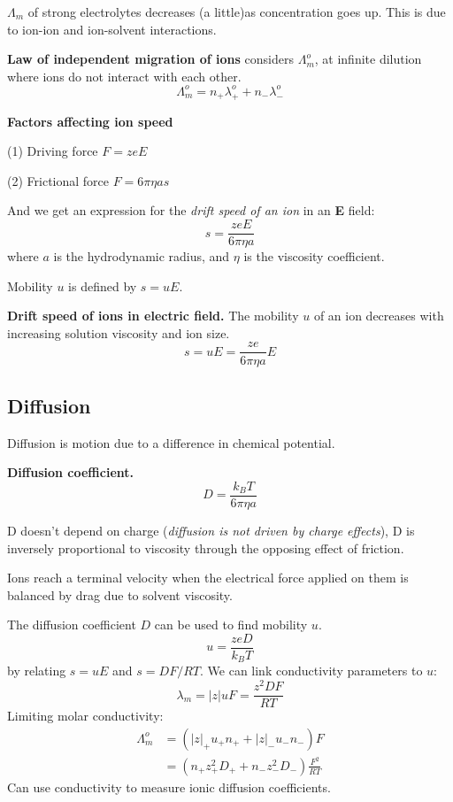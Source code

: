 $\Lambda_m$ of strong electrolytes decreases (a little)as concentration goes up. This is due to ion-ion and ion-solvent interactions.

\textbf{Law of independent migration of ions} considers $\Lambda_m^o$, at infinite dilution where ions do not interact with each other.
\begin{equation*}
    \Lambda_m^o = n_{+} \lambda_{+}^o + n_{-} \lambda_{-}^o
\end{equation*}

\textbf{Factors affecting ion speed}

(1) Driving force $F = zeE$

(2) Frictional force $F = 6 \pi \eta a s$

And we get an expression for the \textit{drift speed of an ion} in an \textbf{E} field:
\begin{equation*}
    s = \frac{zeE}{6 \pi \eta a}
\end{equation*}
where $a$ is the hydrodynamic radius, and $\eta$ is the viscosity coefficient.

Mobility $u$ is defined by $s = uE$.

\textbf{Drift speed of ions in electric field.} The mobility $u$ of an ion decreases with increasing solution viscosity and ion size.
$$s = uE = \frac{ze}{6 \pi \eta a} E$$

\subsection*{Diffusion} %
Diffusion is motion due to a difference in chemical potential.

\textbf{Diffusion coefficient.} $$D = \frac{k_B T}{6 \pi \eta a}$$

D doesn’t depend on charge (\textit{diffusion is not driven by charge effects}), D is inversely proportional to viscosity through the opposing effect of friction.


Ions reach a terminal velocity when the electrical force applied on them is balanced
by drag due to solvent viscosity.
\vspace{\baselineskip}

The diffusion coefficient $D$ can be used to find mobility $u$.
\begin{equation*}
    u = \frac{zeD}{k_B T}
\end{equation*}
by relating $s = uE$ and $s = DF /RT$. We can link conductivity parameters to $u$:
\begin{equation*}
    \lambda_m = |z|uF = \frac{z^2DF}{RT}
\end{equation*}
Limiting molar conductivity: 
\begin{equation*}
    \begin{aligned}
        \Lambda_m^o &= (|z|_{+}u_{+}n_{+} + |z|_{-}u_{-}n_{-})F \\
        &= (n_{+}z^2_{+}D_{+} + n_{-}z^2_{-}D_{-})\frac{F^2}{RT}
    \end{aligned}
\end{equation*}
Can use conductivity to measure ionic diffusion coefficients.

